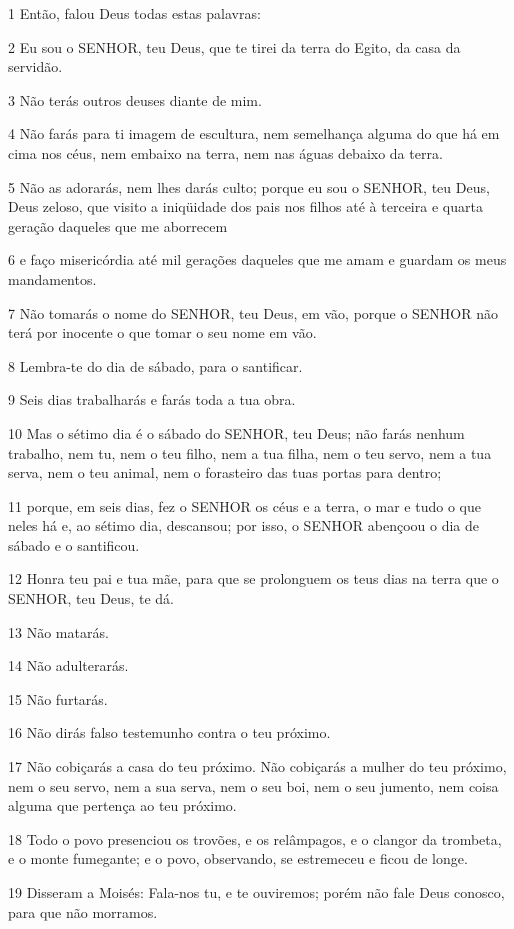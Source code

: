\par 1 Então, falou Deus todas estas palavras:
\par 2 Eu sou o SENHOR, teu Deus, que te tirei da terra do Egito, da casa da servidão.
\par 3 Não terás outros deuses diante de mim.
\par 4 Não farás para ti imagem de escultura, nem semelhança alguma do que há em cima nos céus, nem embaixo na terra, nem nas águas debaixo da terra.
\par 5 Não as adorarás, nem lhes darás culto; porque eu sou o SENHOR, teu Deus, Deus zeloso, que visito a iniqüidade dos pais nos filhos até à terceira e quarta geração daqueles que me aborrecem
\par 6 e faço misericórdia até mil gerações daqueles que me amam e guardam os meus mandamentos.
\par 7 Não tomarás o nome do SENHOR, teu Deus, em vão, porque o SENHOR não terá por inocente o que tomar o seu nome em vão.
\par 8 Lembra-te do dia de sábado, para o santificar.
\par 9 Seis dias trabalharás e farás toda a tua obra.
\par 10 Mas o sétimo dia é o sábado do SENHOR, teu Deus; não farás nenhum trabalho, nem tu, nem o teu filho, nem a tua filha, nem o teu servo, nem a tua serva, nem o teu animal, nem o forasteiro das tuas portas para dentro;
\par 11 porque, em seis dias, fez o SENHOR os céus e a terra, o mar e tudo o que neles há e, ao sétimo dia, descansou; por isso, o SENHOR abençoou o dia de sábado e o santificou.
\par 12 Honra teu pai e tua mãe, para que se prolonguem os teus dias na terra que o SENHOR, teu Deus, te dá.
\par 13 Não matarás.
\par 14 Não adulterarás.
\par 15 Não furtarás.
\par 16 Não dirás falso testemunho contra o teu próximo.
\par 17 Não cobiçarás a casa do teu próximo. Não cobiçarás a mulher do teu próximo, nem o seu servo, nem a sua serva, nem o seu boi, nem o seu jumento, nem coisa alguma que pertença ao teu próximo.
\par 18 Todo o povo presenciou os trovões, e os relâmpagos, e o clangor da trombeta, e o monte fumegante; e o povo, observando, se estremeceu e ficou de longe.
\par 19 Disseram a Moisés: Fala-nos tu, e te ouviremos; porém não fale Deus conosco, para que não morramos.
